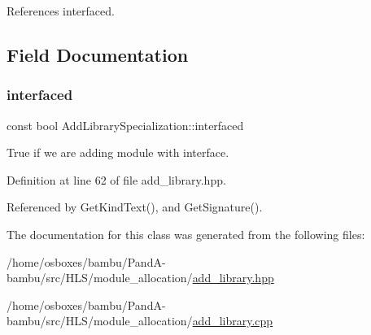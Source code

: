 References interfaced.



\subsection{Field Documentation}
\mbox{\label{classAddLibrarySpecialization_aa556c3ab64f1e7c6bde606aa2e848502}} 
\subsubsection{\texorpdfstring{interfaced}{interfaced}}
{\footnotesize\ttfamily const bool Add\+Library\+Specialization\+::interfaced}



True if we are adding module with interface. 



Definition at line 62 of file add\+\_\+library.\+hpp.



Referenced by Get\+Kind\+Text(), and Get\+Signature().



The documentation for this class was generated from the following files\+:\begin{DoxyCompactItemize}
\item 
/home/osboxes/bambu/\+Pand\+A-\/bambu/src/\+H\+L\+S/module\+\_\+allocation/\hyperlink{add__library_8hpp}{add\+\_\+library.\+hpp}\item 
/home/osboxes/bambu/\+Pand\+A-\/bambu/src/\+H\+L\+S/module\+\_\+allocation/\hyperlink{add__library_8cpp}{add\+\_\+library.\+cpp}\end{DoxyCompactItemize}

